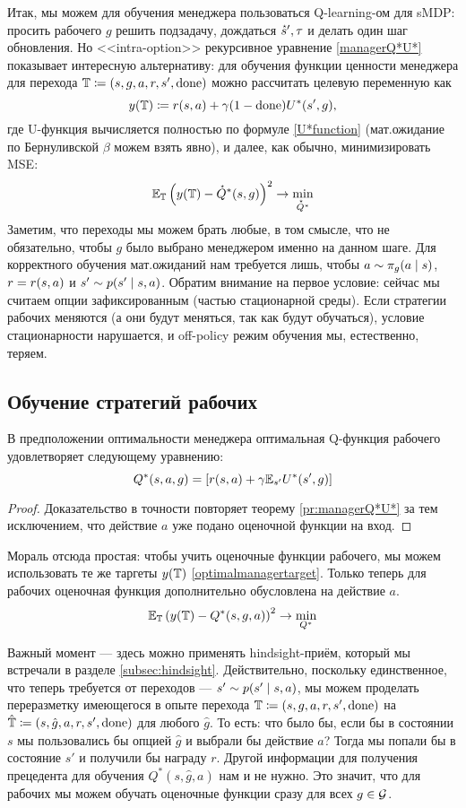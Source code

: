 Итак, мы можем для обучения менеджера пользоваться Q-learning-ом для sMDP: просить рабочего $g$ решить подзадачу, дождаться $\accentset{\star}{s}', \tau$ и делать один шаг обновления. Но <<intra-option>> рекурсивное уравнение \eqref{managerQ*U*} показывает интересную альтернативу: для обучения функции ценности менеджера для перехода $\mathbb{T} \coloneqq (s, g, a, r, s', \mathrm{done})$ можно рассчитать целевую переменную как
\begin{equation}\label{optimalmanagertarget}
y(\mathbb{T}) \coloneqq r(s, a) + \gamma (1 - \mathrm{done}) U^*(s', g),
\end{equation}
где U-функция вычисляется полностью по формуле \eqref{U*function} (мат.ожидание по Бернуливской $\beta$ можем взять явно), и далее, как обычно, минимизировать MSE:
$$\mathbb{E}_{\mathbb{T}} \left(y(\mathbb{T}) - \accentset{\star}{Q}^*(s, g)\right)^2 \to \min_{\accentset{\star}{Q}^*}$$
Заметим, что переходы мы можем брать любые, в том смысле, что не обязательно, чтобы $g$ было выбрано менеджером именно на данном шаге. Для корректного обучения мат.ожиданий нам требуется лишь, чтобы $a \HM\sim \pi_g(a \HM\mid s)$, $r \HM= r(s, a)$ и $s' \HM\sim p(s' \HM\mid s, a)$. Обратим внимание на первое условие: сейчас мы считаем опции зафиксированным (частью стационарной среды). Если стратегии рабочих меняются (а они будут меняться, так как будут обучаться), условие стационарности нарушается, и off-policy режим обучения мы, естественно, теряем. 

\subsection{Обучение стратегий рабочих}

\begin{proposition}
В предположении оптимальности менеджера оптимальная Q-функция рабочего удовлетворяет следующему уравнению:
$$Q^*(s, a, g) = \left[ r(s, a) + \gamma \mathbb{E}_{s'} U^*(s', g)\right]$$
\begin{proof}
Доказательство в точности повторяет теорему \ref{pr:managerQ*U*} за тем исключением, что действие $a$ уже подано оценочной функции на вход.
\end{proof}
\end{proposition}

Мораль отсюда простая: чтобы учить оценочные функции рабочего, мы можем использовать те же таргеты $y(\mathbb{T})$ \eqref{optimalmanagertarget}. Только теперь для рабочих оценочная функция дополнительно обусловлена на действие $a$.
$$\mathbb{E}_{\mathbb{T}} \left(y(\mathbb{T}) - Q^*(s, g, a)\right)^2 \to \min_{Q^*}$$

Важный момент --- здесь можно применять hindsight-приём, который мы встречали в разделе \ref{subsec:hindsight}. Действительно, поскольку единственное, что теперь требуется от переходов --- $s' \HM\sim p(s' \HM\mid s, a)$, мы можем проделать переразметку имеющегося в опыте перехода $\mathbb{T} \coloneqq (s, g, a, r, s', \mathrm{done})$ на $\hat{\mathbb{T}} \coloneqq (s, \hat{g}, a, r, s', \mathrm{done})$ для любого $\hat{g}$. То есть: что было бы, если бы в состоянии $s$ мы пользовались бы опцией $\hat{g}$ и выбрали бы действие $a$? Тогда мы попали бы в состояние $s'$ и получили бы награду $r$. Другой информации для получения прецедента для обучения $Q^*(s, \hat{g}, a)$ нам и не нужно. Это значит, что для рабочих мы можем обучать оценочные функции сразу для всех $g \in \mathcal{G}$.

